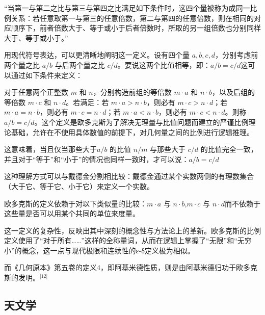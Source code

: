“当第一与第二之比与第三与第四之比满足如下条件时，这四个量被称为成同一比例关系：若任意取第一与第三的任意倍数，第二与第四的任意倍数，则在相同的对应顺序下，前者倍数大于、等于或小于后者倍数时，所取的另一组倍数也分别同样大于、等于或小于。”

用现代符号表达，可以更清晰地阐明这一定义。设有四个量 $a, b, c, d$，分别考虑前两个量之比 $a/b$ 与后两个量之比 $c/d$。要说这两个比值相等，即：$a/b = c/d$这可以通过如下条件来定义：

对于任意两个正整数 $m$ 和 $n$，分别构造前组的等倍数 $m \cdot a$ 和 $n \cdot b$，以及后组的等倍数 $m \cdot c$ 和 $n \cdot d$。若满足：若 $m \cdot a > n \cdot b$，则必有 $m \cdot c > n \cdot d$；若 $m \cdot a = n \cdot b$，则必有 $m \cdot c = n \cdot d$；若 $m \cdot a < n \cdot b$，则必有 $m \cdot c < n \cdot d$。则称 $a/b = c/d$。这个定义是欧多克斯为了解决无理量与比值问题而建立的严谨比例理论基础，允许在不使用具体数值的前提下，对几何量之间的比例进行逻辑推理。

这意味着，当且仅当那些大于$a/b$ 的比值 $n/m$ 与那些大于 $c/d$ 的比值完全一致，并且对于“等于”和“小于”的情况也同样一致时，才可以说：$a/b = c/d$

这种理解方式可以与戴德金分割相比较：戴德金通过某个实数两侧的有理数集合（大于它、等于它、小于它）来定义一个实数。

欧多克斯的定义依赖于对以下类似量的比较：$m \cdot a$ 与 $n \cdot b$,$m \cdot c$ 与 $n \cdot d$而不依赖于这些量是否可以用某个共同的单位来度量。

这一定义的复杂性，反映出其中深刻的概念性与方法论上的革新。欧多克斯的比例定义使用了“对于所有……”这样的全称量词，从而在逻辑上掌握了“无限”和“无穷小”的概念，这一点与现代极限和连续性的ε-δ定义极为相似。

而《几何原本》第五卷的定义4，即阿基米德性质，则是由阿基米德归功于欧多克斯的发明。\(^\text{[12]}\)
\subsection{天文学}